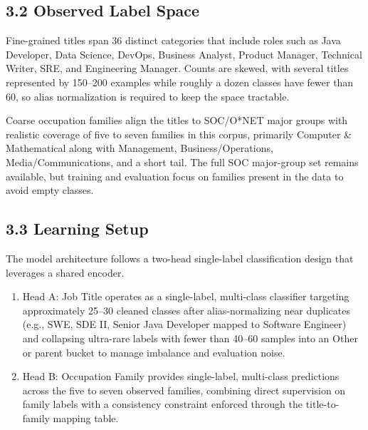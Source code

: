 \documentclass[12pt]{article}
\begin{document}
\medskip

\subsection*{3.2 Observed Label Space}
Fine-grained titles span 36 distinct categories that include roles such as Java Developer, Data Science, DevOps, Business Analyst, Product Manager, Technical Writer, SRE, and Engineering Manager. Counts are skewed, with several titles represented by 150--200 examples while roughly a dozen classes have fewer than 60, so alias normalization is required to keep the space tractable.

\medskip

Coarse occupation families align the titles to SOC/O*NET major groups with realistic coverage of five to seven families in this corpus, primarily Computer \& Mathematical along with Management, Business/Operations, Media/Communications, and a short tail. The full SOC major-group set remains available, but training and evaluation focus on families present in the data to avoid empty classes.

\medskip

\subsection*{3.3 Learning Setup}
The model architecture follows a two-head single-label classification design that leverages a shared encoder.
\begin{enumerate}
  \item Head A: Job Title operates as a single-label, multi-class classifier targeting approximately 25--30 cleaned classes after alias-normalizing near duplicates (e.g., SWE, SDE II, Senior Java Developer mapped to Software Engineer) and collapsing ultra-rare labels with fewer than 40--60 samples into an Other or parent bucket to manage imbalance and evaluation noise.
  \item Head B: Occupation Family provides single-label, multi-class predictions across the five to seven observed families, combining direct supervision on family labels with a consistency constraint enforced through the title-to-family mapping table.
\end{enumerate}

\medskip
\end{document}
